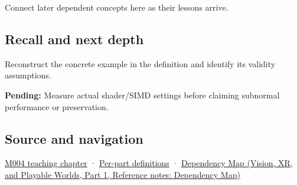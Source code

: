 \hypertarget{appendix-e979eb012782-used-by}{}

Connect later dependent concepts here as their lessons arrive.

\subsection{Recall and next depth}\label{appendix-e979eb012782-recall-and-next-depth}

\hypertarget{appendix-e979eb012782-recall-and-next-depth}{}

Reconstruct the concrete example in the definition and identify its validity assumptions.

\textbf{Pending:} Measure actual shader/SIMD settings before claiming subnormal performance or preservation.

\subsection{Source and navigation}\label{appendix-e979eb012782-source-and-navigation}

\hypertarget{appendix-e979eb012782-source-and-navigation}{}

\hyperref[01-foundations-i-ch001-a-stretching-ruler-for-real-valued-quantities]{M004 teaching chapter} · \hyperref[appendix-fd090d982a15-m004---parts-61-76]{Per-part definitions} · \href{../07-Vision-XR-and-Playable-Worlds-P01/main.pdf\#appendix-4ad47bdd269a}{Dependency Map (Vision, XR, and Playable Worlds, Part 1, Reference notes: Dependency Map)}
